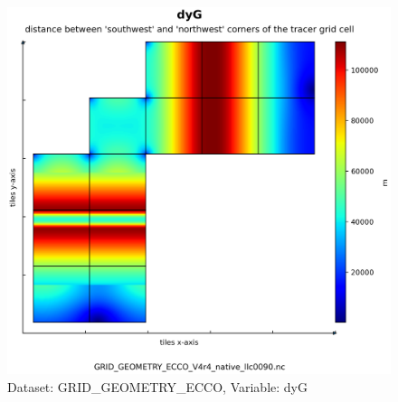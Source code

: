\begin{figure}[H]
\centering
\includegraphics[scale=0.55]{../images/plots/native_plots_coords/Geometry_Parameters_for_the_Lat-Lon-Cap_90_(llc90)_Native_Model_Grid_(Version_4_Release_4)/dyG.png}
\caption{Dataset: GRID\_GEOMETRY\_ECCO, Variable: dyG}
\label{tab:table-GRID_GEOMETRY_ECCO_dyG-Plot}
\end{figure}
\pagebreak
